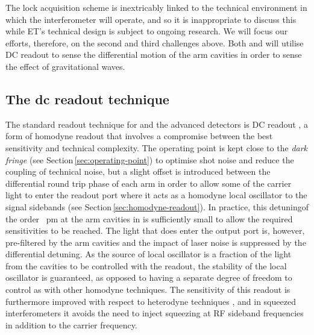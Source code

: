 The lock acquisition scheme is inextricably linked to the technical environment in which the interferometer will operate, and so it is inappropriate to discuss this while \gls{ET}'s technical design is subject to ongoing research. We will focus our efforts, therefore, on the second and third challenges above. Both \ETLF{} and \ETHF{} will utilise \gls{DC} readout to sense the differential motion of the arm cavities in order to sense the effect of gravitational waves.

\subsection{The dc readout technique}
The standard readout technique for \GEOHF{} and the advanced detectors is \gls{DC} readout \cite{Hild2007, Ward2008, Fricke2012}, a form of homodyne readout that involves a compromise between the best sensitivity and technical complexity. The operating point is kept close to the \emph{dark fringe} (see Section\,\ref{sec:operating-point}) to optimise shot noise and reduce the coupling of technical noise, but a slight offset is introduced between the differential round trip phase of each arm in order to allow some of the carrier light to enter the readout port where it acts as a homodyne local oscillator to the signal sidebands (see Section\,\ref{sec:homodyne-readout}). In practice, this detuning\textemdash of the order \SI{}{\pico\meter} at the arm cavities in \ALIGO{}\textemdash is sufficiently small to allow the required sensitivities to be reached. The light that does enter the output port is, however, pre-filtered by the arm cavities and the impact of laser noise is suppressed by the differential detuning. As the source of local oscillator is a fraction of the light from the cavities to be controlled with the readout, the stability of the local oscillator is guaranteed, as opposed to having a separate degree of freedom to control as with other homodyne techniques. The sensitivity of this readout is furthermore improved with respect to heterodyne techniques \cite{Fricke2012}, and in squeezed interferometers it avoids the need to inject squeezing at \gls{RF} sideband frequencies in addition to the carrier frequency.

